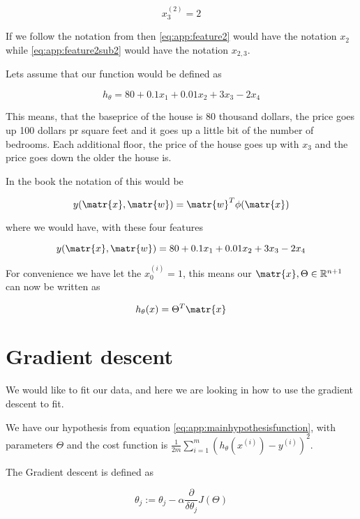 \begin{equation}\label{eq:app:feature2sub2}
  x^{(2)}_3 = 2
\end{equation}



If we follow the notation from \cite{bishop2006pattern} then \ref{eq:app:feature2} would have the notation $x_{2}$ while \ref{eq:app:feature2sub2} would have the notation $x_{2,3}$.

Lets assume that our function would be defined as

\begin{equation}\label{eq:app:definedfunctionexample}
  h_{\theta} = 80 + 0.1x_1 + 0.01x_2 + 3x_3 - 2x_4
\end{equation}


This means, that the baseprice of the house is 80 thousand dollars, the price goes up 100 dollars pr square feet and it goes up a little bit of the number of bedrooms. Each additional floor, the price of the house goes up with $x_3$ and the price goes down the older the house is.

In the book \cite{bishop2006pattern} the notation of this would be

\[
  y(\matr{x}, \matr{w}) = \matr{w}^T\phi(\matr{x})
\]

where we would have, with these four features

\[
  y(\matr{x}, \matr{w}) = 80 + 0.1x_1 + 0.01x_2 + 3x_3 - 2x_4
\]

For convenience we have let the $x^{(i)}_0 = 1$, this means our $\matr{x},\Theta\in\mathbb{R}^{n+1}$ can now be written as

\begin{equation}\label{eq:app:mainhypothesisfunction}
  h_{\theta}(x) = \Theta^T\matr{x}
\end{equation}

\section{Gradient descent}

We would like to fit our data, and here we are looking in how to use the gradient descent to fit.

We have our hypothesis from equation \ref{eq:app:mainhypothesisfunction}, with parameters $\Theta$ and the cost function is $\frac{1}{2m}\sum_{i=1}^{m}(h_\theta(x^{(i)}) - y^{(i)})^2$.

The Gradient descent is defined as

\begin{equation}\label{eq:app:gradientdescentdefinition}
  \theta_j := \theta_j - \alpha \frac{\partial}{\delta\theta_j}J(\Theta)
\end{equation}

